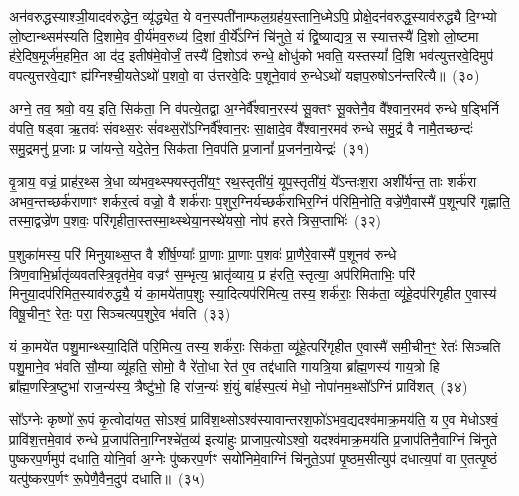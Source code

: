 अन॑वरुद्धस्याश्ञी॒यादव॑रुद्धेन॒ व्यृ॑द्ध्येत॒ ये वन॒स्पती॑नाम्फल॒ग्रह॑य॒स्तानि॒ध्मे\-ऽपि॒ प्रोक्षे॒दन॑वरुद्ध॒स्याव॑रुद्ध्यै दि॒ग्भ्यो लो॒ष्टान्थ्सम॑स्यति दि॒शामे॒व वी॒र्य॑मव॒रुध्य॑ दि॒शां वी॒र्ये᳚\-ऽग्निं चि॑नुते॒ यं द्वि॒ष्याद्यत्र॒ स स्यात्तस्यै॑ दि॒शो लो॒ष्टमा ह॑रे॒दिष॒मूर्ज॑म॒हमि॒त आ द॑द॒ इतीष॑मे॒वोर्जं॒ तस्यै॑ दि॒शो\-ऽव॑ रुन्धे॒ क्षोधु॑को भवति॒ यस्तस्यां᳚ दि॒शि भव॑त्युत्तरवे॒दिमुप॑ वपत्युत्तरवे॒द्याꣳ ह्य॑ग्निश्ची॒यते\-ऽथो॑ प॒शवो॒ वा उ॑त्तरवे॒दिः प॒शूने॒वाव॑ रु॒न्धे\-ऽथो॑ यज्ञप॒रुषो\-ऽन॑न्तरित्यै॥~(३०)

{\anuvakamend[{च॒ भ॒व॒त्ये॒ताव॒द्वै पुरु॑षे वी॒र्यं॑ यत्कृ॒ष्टञ्चाकृ॑ष्टं च॒ दिख्सीता॑ अग्नि॒चिदव॒ पञ्च॑विꣳशतिश्च}]}%

अग्ने॒ तव॒ श्रवो॒ वय॒ इति॒ सिक॑ता॒ नि व॑पत्ये॒तद्वा अ॒ग्नेर्वै᳚श्वान॒रस्य॑ सू॒क्तꣳ सू॒क्तेनै॒व वै᳚श्वान॒रमव॑ रुन्धे ष॒ड्भिर्नि व॑पति॒ षड्वा ऋ॒तवः॑ संवथ्स॒रः सं॑वथ्स॒रो᳚\-ऽग्निर्वै᳚श्वान॒रः सा॒क्षादे॒व वै᳚श्वान॒रमव॑ रुन्धे समु॒द्रं वै नामै॒तच्छन्दः॑ समु॒द्रमनु॑ प्र॒जाः प्र जा॑यन्ते॒ यदे॒तेन॒ सिक॑ता नि॒वप॑ति प्र॒जानां᳚ प्र॒जन॑ना॒येन्द्रः॑~(३१)

वृ॒त्राय॒ वज्रं॒ प्राह॑र॒थ्स त्रे॒धा व्य॑भव॒थ्स्फ्यस्तृती॑य॒ꣳ॒ रथ॒स्तृती॑यं॒ यूप॒स्तृती॑यं॒ ये᳚\-ऽन्तःश॒रा अशी᳚र्यन्त॒ ताः शर्क॑रा अभव॒न्तच्छर्क॑राणाꣳ शर्कर॒त्वं वज्रो॒ वै शर्क॑राः प॒शुर॒ग्निर्यच्छर्क॑राभिर॒ग्निं प॑रिमि॒नोति॒ वज्रे॑णै॒वास्मै॑ प॒शून्परि॑ गृह्णाति॒ तस्मा॒द्वज्रे॑ण प॒शवः॒ परि॑गृहीता॒स्तस्मा॒थ्स्थेया॒नस्थे॑यसो॒ नोप॑ हरते त्रिस॒प्ताभिः॑~(३२)

प॒शुका॑मस्य॒ परि॑ मिनुयाथ्स॒प्त वै शी॑र्\mbox{}ष॒ण्याः᳚ प्रा॒णाः प्रा॒णाः प॒शवः॑ प्रा॒णैरे॒वास्मै॑ प॒शूनव॑ रुन्धे त्रिण॒वाभि॒\-र्भ्रातृ॑व्यवतस्त्रि॒वृत॑मे॒व वज्रꣳ॑ स॒म्भृत्य॒ भ्रातृ॑व्याय॒ प्र ह॑रति॒ स्तृत्या॒ अप॑रिमिताभिः॒ परि॑ मिनुया॒दप॑रिमित॒स्याव॑रुद्ध्यै॒ यं का॒मये॑ताप॒शुः स्या॒दित्यप॑रिमित्य॒ तस्य॒ शर्क॑राः॒ सिक॑ता॒ व्यू॑हे॒दप॑रिगृहीत ए॒वास्य॑ विषू॒चीन॒ꣳ॒ रेतः॒ परा॒ सिञ्चत्यप॒शुरे॒व भ॑वति~(३३)

यं का॒मये॑त पशु॒मान्थ्स्या॒दिति॑ परि॒मित्य॒ तस्य॒ शर्क॑राः॒ सिक॑ता॒ व्यू॑हे॒त्परि॑गृहीत ए॒वास्मै॑ समी॒चीन॒ꣳ॒ रेतः॑ सिञ्चति पशु॒माने॒व भ॑वति सौ॒म्या व्यू॑हति॒ सोमो॒ वै रे॑तो॒धा रेत॑ ए॒व तद्द॑धाति गायत्रि॒या ब्रा᳚ह्म॒णस्य॑ गाय॒त्रो हि ब्रा᳚ह्म॒णस्त्रि॒ष्टुभा॑ राज॒न्य॑स्य॒ त्रैष्टु॑भो॒ हि रा॑ज॒न्यः॑ शं॒युं बा॑र्\mbox{}हस्प॒त्यं मेधो॒ नोपा॑नम॒थ्सो᳚\-ऽग्निं प्रावि॑शत्~(३४)

सो᳚\-ऽग्नेः कृष्णो॑ रू॒पं कृ॒त्वोदा॑यत॒ सो\-ऽश्वं॒ प्रावि॑श॒थ्सो\-ऽश्व॑स्यावान्तरश॒फो॑\-ऽभव॒द्यदश्व॑माक्र॒मय॑ति॒ य ए॒व मेधो\-ऽश्वं॒ प्रावि॑श॒त्तमे॒वाव॑ रुन्धे प्र॒जा\-प॑तिना॒ग्निश्चे॑त॒व्य॑ इत्या॑हुः प्राजाप॒त्यो\-ऽश्वो॒ यदश्व॑माक्र॒मय॑ति प्र॒जा\-प॑तिनै॒वाग्निं चि॑नुते पुष्करप॒र्णमुप॑ दधाति॒ योनि॒र्वा अ॒ग्नेः पु॑ष्करप॒र्णꣳ सयो॑निमे॒वाग्निं चि॑नुते॒\-ऽपां पृ॒ष्ठम॒सीत्युप॑ दधात्य॒पां वा ए॒तत्पृ॒ष्ठं यत्पु॑ष्करप॒र्णꣳ रू॒पेणै॒वैन॒दुप॑ दधाति॥~(३५)

